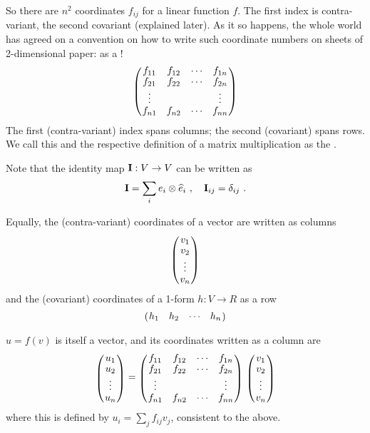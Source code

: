 So there are $n^2$ coordinates $f_{ij}$ for a linear function $f$. The first
index is contra-variant, the second covariant (explained later). As
it so happens, the whole world has agreed on a convention on how to
write such coordinate numbers on sheets of 2-dimensional paper: as
a !
\begin{equation}
\mat{cccc}{
f_{11} & f_{12} & \cdots & f_{1n} \\
f_{21} & f_{22} & \cdots & f_{2n} \\
\vdots & & & \vdots \\
f_{n1} & f_{n2} & \cdots & f_{nn}}
\end{equation}
The first (contra-variant) index spans columns; the second
(covariant) spans rows. We call this and the respective definition of
a matrix multiplication as the .

Note that the identity map ${\rm\bf I}: V \to V$ can be written as
\begin{align}
{\rm\bf I} = \sum_i e_i \otimes \widehat e_i ~,\quad {\rm\bf I}_{ij} = \delta_{ij} ~.
\end{align}

Equally, the (contra-variant) coordinates of a vector are written as
columns
\begin{equation}
\mat{c}{v_1 \\ v_2 \\ \vdots \\ v_n} 
\end{equation}
and the (covariant) coordinates of a 1-form $h: V \to R$ as a row
\begin{equation}
\mat{cccc}{h_{1} & h_{2} & \cdots & h_{n} }
\end{equation}

$u = f(v)$ is itself a vector, and its coordinates written as a column are
\begin{equation}
\mat{c}{ u_1 \\ u_2 \\ \vdots \\ u_n}
=
\mat{cccc}{
f_{11} & f_{12} & \cdots & f_{1n} \\
f_{21} & f_{22} & \cdots & f_{2n} \\
\vdots & & & \vdots \\
f_{n1} & f_{n2} & \cdots & f_{nn}}~ 
\mat{c}{
v_1 \\
v_2 \\
\vdots \\
v_n}
\end{equation}
where this  is defined by $u_i = \sum_j
f_{ij} v_j$, consistent to the above.

